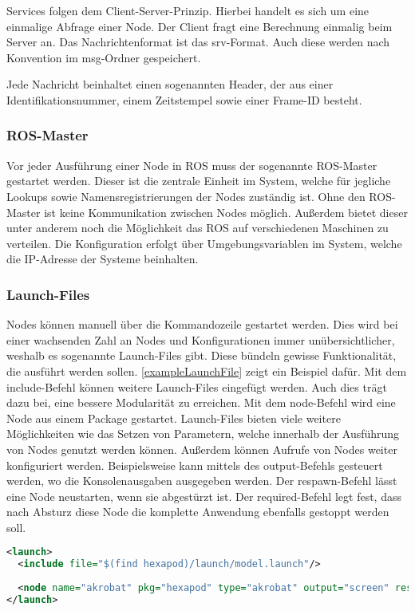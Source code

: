 Services folgen dem Client-Server-Prinzip. Hierbei handelt es sich um eine einmalige Abfrage einer Node. Der Client fragt eine Berechnung einmalig beim Server an.  Das Nachrichtenformat ist das srv-Format. Auch diese werden nach Konvention im msg-Ordner gespeichert.
    
Jede Nachricht beinhaltet einen sogenannten Header, der aus einer Identifikationsnummer, einem Zeitstempel sowie einer Frame-ID besteht.

\subsubsection{ROS-Master}

Vor jeder Ausführung einer Node in \ac{ROS} muss der sogenannte \ac{ROS}-Master gestartet werden. Dieser ist die zentrale Einheit im System, welche für jegliche Lookups sowie Namensregistrierungen der Nodes zuständig ist. Ohne den \ac{ROS}-Master ist keine Kommunikation zwischen Nodes möglich. Außerdem bietet dieser unter anderem noch die Möglichkeit das \ac{ROS} auf verschiedenen Maschinen zu verteilen. Die Konfiguration erfolgt über Umgebungsvariablen im System, welche die IP-Adresse der Systeme beinhalten.

\subsubsection{Launch-Files}

Nodes können manuell über die Kommandozeile gestartet werden. Dies wird bei einer wachsenden Zahl an Nodes und Konfigurationen immer unübersichtlicher, weshalb es sogenannte Launch-Files gibt. Diese bündeln gewisse Funktionalität, die ausführt werden sollen. \autoref{exampleLaunchFile} zeigt ein Beispiel dafür. Mit dem include-Befehl können weitere Launch-Files eingefügt werden. Auch dies trägt dazu bei, eine bessere Modularität zu erreichen. Mit dem node-Befehl wird eine Node aus einem Package gestartet. Launch-Files bieten viele weitere Möglichkeiten wie das Setzen von Parametern, welche innerhalb der Ausführung von Nodes genutzt werden können. Außerdem können Aufrufe von Nodes weiter konfiguriert werden. Beispielsweise kann mittels des output-Befehls gesteuert werden, wo die Konsolenausgaben ausgegeben werden. Der respawn-Befehl lässt eine Node neustarten, wenn sie abgestürzt ist. Der required-Befehl legt fest, dass nach Absturz diese Node die komplette Anwendung ebenfalls gestoppt werden soll.

\begin{lstlisting}[label={exampleLaunchFile}, language=Xml, caption={Beispiel eines Launch-Files}]
<launch>
  <include file="$(find hexapod)/launch/model.launch"/>
  
  <node name="akrobat" pkg="hexapod" type="akrobat" output="screen" respawn="false" required="true"></node>
</launch>
\end{lstlisting}
  
